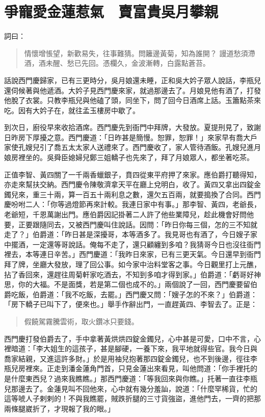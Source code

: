 
\chapter{爭寵愛金蓮惹氣　賣富貴吳月攀親}

詞曰：
\begin{quote}
情懷增悵望，新歡易失，往事難猜。問籬邊黃菊，知為誰開？
謾道愁須滯酒，酒未醒、愁已先回。憑欄久，金波漸轉，白露點蒼苔。
\end{quote}

話說西門慶歸家，已有三更時分，吳月娘還未睡，正和吳大妗子眾人說話，李瓶兒還伺候著與他遞酒。大妗子見西門慶來家，就過那邊去了。月娘見他有酒了，打發他脫了衣裳。只教李瓶兒與他磕了頭，同坐下，問了回今日酒席上話。玉簫點茶來吃。因有大妗子在，就往孟玉樓房中歇了。

到次日，廚役早來收拾酒席。西門慶先到衙門中拜牌，大發放。夏提刑見了，致謝日昨房下厚擾之意。西門慶道：「日昨甚是簡慢。恕罪，恕罪！」來家早有喬大戶家使孔嫂兒引了喬五太太家人送禮來了。西門慶收了，家人管待酒飯。孔嫂兒進月娘房裡坐的。吳舜臣媳婦兒鄭三姐轎子也先來了，拜了月娘眾人，都坐著吃茶。

正值李智、黃四關了一千兩香蠟銀子，賁四從東平府押了來家。應伯爵打聽得知，亦走來幫扶交納。西門慶令陳敬濟拿天平在廳上兌明白，收了。黃四又拿出四錠金鐲兒來，重三十兩，算一百五十兩利息之數，還欠五百兩，就要搗換了合同。西門慶吩咐二人：「你等過燈節再來計較。我連日家中有事。」那李智、黃四，老爺長，老爺短，千恩萬謝出門。應伯爵因記掛著二人許了他些業障兒，趁此機會好問他要，正要跟隨同去，又被西門慶叫住說話。因問：「昨日你每三個，怎的三不知就走了？」伯爵道：「昨日甚是深擾哥，本等酒多了。我見哥也有酒了，今日嫂子家中擺酒，一定還等哥說話。俺每不走了，還只顧纏到多咱？我猜哥今日也沒往衙門裡去，本等連日辛苦。」西門慶道：「我昨日來家，已有三更天氣。今日還早到衙門拜了牌，坐廳大發放，理了回公事。如今家中治料堂客之事。今日觀里打上元醮，拈了香回來，還趕往周菊軒家吃酒去，不知到多咱才得到家。」伯爵道：「虧哥好神思，你的大福。不是面獎，若是第二個也成不的。」兩個說了一回，西門慶要留伯爵吃飯，伯爵道：「我不吃飯，去罷。」西門慶又問：「嫂子怎的不來？」伯爵道：「房下轎子已叫下了，便來也。」舉手作辭出門，一直趕黃四、李智去了。正是：
\begin{quote}
假饒駕霧騰雲術，取火鑽冰只要錢。
\end{quote}

西門慶打發伯爵去了，手中拿著黃烘烘四錠金鐲兒，心中甚是可愛，口中不言，心裡暗道：「李大姐生的這孩子，甚是腳硬，一養下來，我平地就得些官。我今日與喬家結親，又進這許多財。」於是用袖兒抱著那四錠金鐲兒，也不到後邊，徑往李瓶兒房裡來。正走到潘金蓮角門首，只見金蓮出來看見，叫他問道：「你手裡托的是什麼東西兒？過來我瞧瞧。」那西門慶道：「等我回來與你瞧。」托著一直往李瓶兒那邊去了。金蓮見叫不回他來，心中就有幾分羞訕，說道：「什麼罕稀貨，忙的這等唬人子剌剌的！不與我瞧罷，賊跌折腿的三寸貨強盜，進他門去，一齊的把那兩條腿崴折了，才現報了我的眼。」

